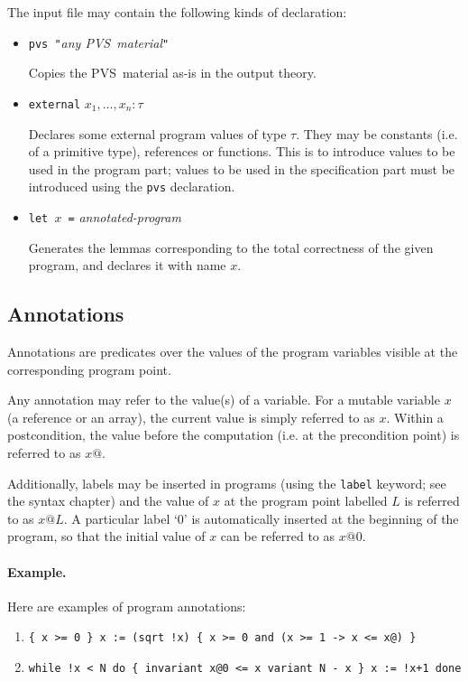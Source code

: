 \documentclass[a4paper,12pt]{report}
\newcommand{\pvs}{\textsf{PVS}}
\newcommand{\te}[1]{\texttt{#1}}
\begin{document}
The input file may contain the following kinds of declaration:
\begin{itemize}
  \item \te{pvs "}\textit{any \pvs\ material}\te{"} \par
    Copies the \pvs\ material as-is in the output theory.

  \item \te{external} $x_1,\dots,x_n: \tau$ \par 
    Declares some external program values of type $\tau$.
    They may be constants (i.e. of a primitive type), references 
    or functions. This is to introduce values to be used
    in the program part; values to be used in the specification part
    must be introduced using the \te{pvs} declaration.

  \item \te{let $x$ =} \textit{annotated-program} \par
    Generates the lemmas corresponding to the total correctness of
    the given program, and declares it with name $x$.
\end{itemize}

\subsection{Annotations}

Annotations are predicates over the values of the program variables
visible at the corresponding program point.

Any annotation may refer to the value(s) of a variable.  For a mutable
variable $x$ (a reference or an array), the current value is simply
referred to as $x$. Within a postcondition, the value before the
computation (i.e. at the precondition point) is referred to as $x@$.

Additionally, labels may be inserted in programs (using the 
\te{label} keyword; see the syntax chapter) and the value of $x$ at the
program point labelled $L$ is referred to as $x@L$.
A particular label `0' is automatically inserted at the beginning of the 
program, so that the initial value of $x$ can be referred to as $x@0$.

\paragraph{Example.} Here are examples of program annotations:
\begin{enumerate}
\item
  \verb#{ x >= 0 } x := (sqrt !x) { x >= 0 and (x >= 1 -> x <= x@) }# 
\item
  \verb#while !x < N do { invariant x@0 <= x variant N - x } x := !x+1 done#
\end{enumerate}
\end{document}
